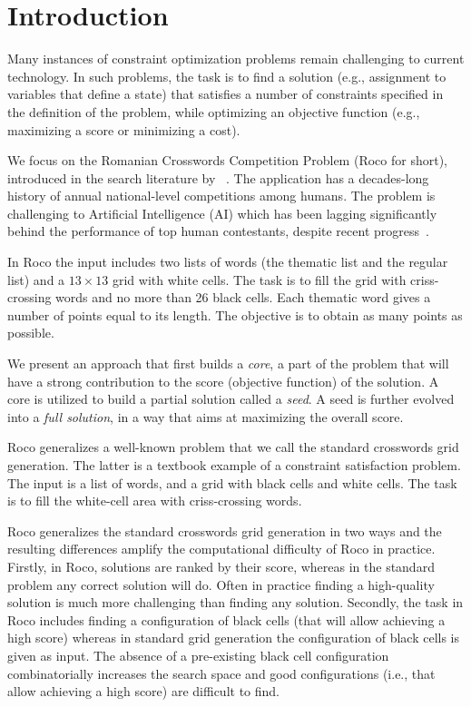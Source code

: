 \section{Introduction}
\label{sec::intro}

Many instances of constraint optimization problems
remain challenging to current technology.
In such problems, the task is to find a solution
(e.g., assignment to variables that define a state) 
that satisfies a number of constraints specified in the definition
of the problem, while optimizing an objective function
(e.g., maximizing a score or minimizing a cost).

We focus on the Romanian Crosswords Competition Problem ({\sc Roco} for short),
introduced in the search literature by
\citeauthor{DBLP:conf/socs/BoteaB21}~.
The application has a decades-long history of annual national-level competitions among humans.
The problem is challenging to Artificial Intelligence (AI) which has been lagging significantly
behind the performance of top human contestants,
despite recent progress~\cite{DBLP:conf/socs/BoteaB21,DBLP:conf/cig/BulitkoB21,Botea_Bulitko_2022}.

In {\sc Roco} the input includes two lists of words (the thematic list and the regular list)
and a $13 \times 13$ grid with white cells.
The task is to fill the grid with criss-crossing words and no more than 26 black cells.
Each thematic word gives a number of points equal to its length. The objective
is to obtain as many points as possible.

We present an approach that first builds a \emph{core},
a part of the problem that will have a strong contribution
to the score (objective function) of the solution.
A core is utilized to build a partial solution called a {\em seed}.
A seed is further evolved into a {\em full solution}, in a way that aims
at maximizing the overall score.

{\sc Roco} generalizes a well-known problem that we
call the {standard crosswords grid generation}.
The latter is a textbook example of a constraint satisfaction problem.
The input is a list of words, and a grid with black cells and white cells.
The task is to fill the white-cell area with criss-crossing words.

{\sc Roco} generalizes the standard crosswords grid generation in two ways
and the resulting differences amplify the computational difficulty of {\sc Roco} in practice.
Firstly, in {\sc Roco}, solutions are ranked by their score,
whereas in the standard problem any correct solution will do.
Often in practice finding a high-quality solution is much more challenging than finding any solution.
Secondly, the task in {\sc Roco} includes finding a configuration of black cells
(that will allow achieving a high score) whereas in standard grid
generation the configuration of black cells is given as input.
The absence of a pre-existing black cell configuration
combinatorially increases the search space and good configurations
(i.e., that allow achieving a high score) are difficult to find.

